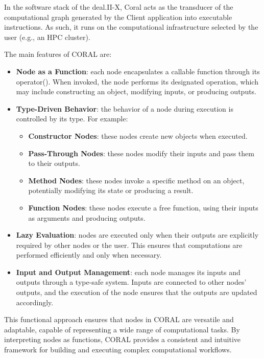 \documentclass[a4paper,12pt]{article}
\begin{document}
In the software stack of the deal.II-X, Coral acts as the transducer of the computational graph generated by the Client application into executable instructions. As such, it runs on the computational infrastructure selected by the user (e.g., an HPC cluster).

The main features of CORAL are:
\begin{itemize}
  \item \textbf{Node as a Function}: each node encapsulates a callable function through its operator(). When invoked, the node performs its designated operation, which may include constructing an object, modifying inputs, or producing outputs.

  \item \textbf{Type-Driven Behavior}: the behavior of a node during execution is controlled by its type. For example:
  \begin{itemize}
    \item \textbf{Constructor Nodes}: these nodes create new objects when executed.
    \item \textbf{Pass-Through Nodes}: these nodes modify their inputs and pass them to their outputs.
    \item \textbf{Method Nodes}: these nodes invoke a specific method on an object, potentially modifying its state or producing a result.
    \item \textbf{Function Nodes}: these nodes execute a free function, using their inputs as arguments and producing outputs.
  \end{itemize}

  \item \textbf{Lazy Evaluation}: nodes are executed only when their outputs are explicitly required by other nodes or the user. This ensures that computations are performed efficiently and only when necessary.

  \item \textbf{Input and Output Management}: each node manages its inputs and outputs through a type-safe system. Inputs are connected to other nodes' outputs, and the execution of the node ensures that the outputs are updated accordingly.
\end{itemize}
This functional approach ensures that nodes in CORAL are versatile and adaptable, capable of representing a wide range of computational tasks. By interpreting nodes as functions, CORAL provides a consistent and intuitive framework for building and executing complex computational workflows.
\end{document}
